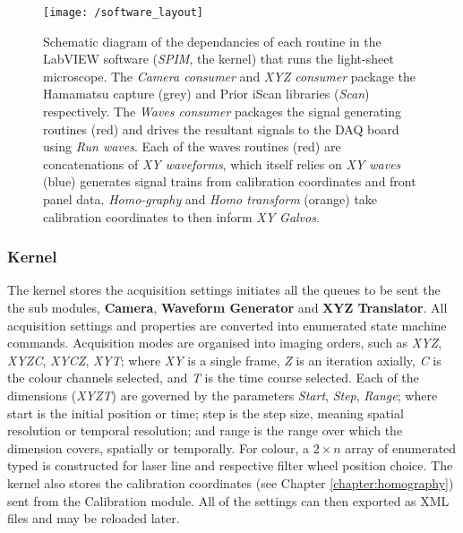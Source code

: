 

\begin{figure}
    \centering
    \texttt{[image: /software\_layout]}
    \caption{Schematic diagram of the dependancies of each routine in the LabVIEW software (\emph{SPIM}, the kernel) that runs the light-sheet microscope.
    The \emph{Camera consumer} and \emph{XYZ consumer} package the Hamamatsu capture (grey) and Prior iScan libraries (\emph{Scan}) respectively.
    The \emph{Waves consumer} packages the signal generating routines (red) and drives the resultant signals to the DAQ board using \emph{Run waves}.
    Each of the waves routines (red) are concatenations of \emph{XY waveforms}, which itself relies on \emph{XY waves} (blue) generates signal trains from calibration coordinates and front panel data.
    \emph{Homo-graphy} and \emph{Homo transform} (orange) take calibration coordinates to then inform \emph{XY Galvos}.
    }
    \label{fig:software_layout}
\end{figure}

\subsubsection{Kernel}

The kernel stores  the acquisition settings initiates all the queues to be sent the the sub modules, \textbf{Camera}, \textbf{Waveform Generator} and \textbf{XYZ Translator}.
All acquisition settings and properties are converted into enumerated state machine commands.
Acquisition modes are organised into imaging orders, such as \emph{XYZ}, \emph{XYZC}, \emph{XYCZ}, \emph{XYT}; where \emph{XY} is a single frame, \emph{Z} is an iteration axially, \emph{C} is the colour channels selected, and \emph{T} is the time course selected.
Each of the dimensions (\emph{XYZT}) are governed by the parameters \emph{Start}, \emph{Step}, \emph{Range}; where start is the initial position or time; step is the step size, meaning spatial resolution or temporal resolution; and range is the range over which the dimension covers, spatially or temporally.
For colour, a $2\times n$ array of enumerated typed is constructed for laser line and respective filter wheel position choice.
The kernel also stores the calibration coordinates (see Chapter \ref{chapter:homography}) sent from the Calibration module.
All of the
settings can then exported as XML files and may be reloaded later.



